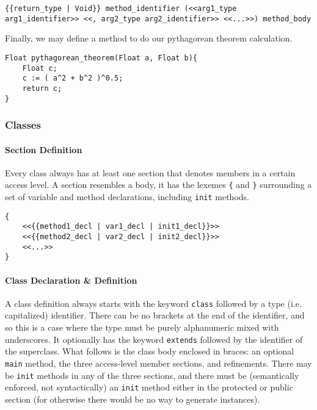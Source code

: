 \begin{lstlisting}
{{return_type | Void}} method_identifier (<<arg1_type arg1_identifier>> <<, arg2_type arg2_identifier>> <<...>>) method_body
\end{lstlisting}

Finally, we may define a method to do our pythagorean theorem calculation.

\begin{lstlisting}[backgroundcolor=\color{tintedorange},caption=Method Definition for the Pythagorean Theorem]
Float pythagorean_theorem(Float a, Float b){
    Float c;
    c := ( a^2 + b^2 )^0.5;
    return c;
}
\end{lstlisting}

\subsubsection{Classes}

\paragraph{Section Definition}
Every class always has at least one section that denotes members in a certain access level. A section resembles a body, it has the lexemes \verb!{! and \verb!}! surrounding a set of variable and method declarations, including \verb!init! methods.

\begin{lstlisting}
{
	<<{{method1_decl | var1_decl | init1_decl}}>>
	<<{{method2_decl | var2_decl | init2_decl}}>>
	<<...>>
}
\end{lstlisting}

\paragraph{Class Declaration \& Definition}
A class definition always starts with the keyword \verb!class! followed by a type (i.e. capitalized) identifier. There can be no brackets at the end of the identifier, and so this is a case where the type must be purely alphanumeric mixed with underscores. It optionally has the keyword \verb!extends! followed by the identifier of the superclass. What follows is the class body enclosed in braces: an optional \verb!main! method, the three access-level member sections, and refinements. There may be \verb!init! methods in any of the three sections, and there must be (semantically enforced, not syntactically) an \verb!init! method either in the protected or public section (for otherwise there would be no way to generate instances).

